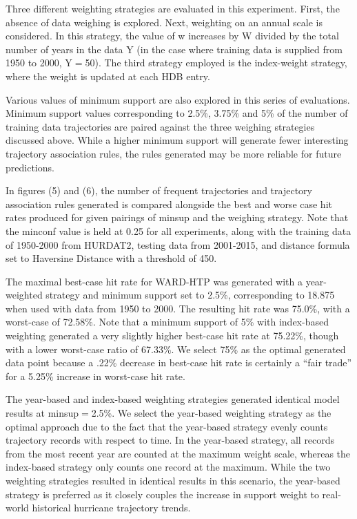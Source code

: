 \documentclass[12pt,conference]{IEEEtran}
\begin{document}
Three different weighting strategies are evaluated in this experiment. First, the absence of data weighing is explored. Next, weighting on an annual scale is considered. In this strategy, the value of w increases by W divided by the total number of years in the data Y (in the case where training data is supplied from 1950 to 2000, Y$=$50). The third strategy employed is the index-weight strategy, where the weight is updated at each HDB entry.

Various values of minimum support are also explored in this series of evaluations. Minimum support values corresponding to 2.5\%, 3.75\% and 5\% of the number of training data trajectories are paired against the three weighing strategies discussed above. While a higher minimum support will generate fewer interesting trajectory association rules, the rules generated may be more reliable for future predictions.

In figures (5) and (6), the number of frequent trajectories and trajectory association rules generated is compared alongside the best and worse case hit rates produced for given pairings of minsup and the weighing strategy. Note that the minconf value is held at 0.25 for all experiments, along with the training data of 1950-2000 from HURDAT2, testing data from 2001-2015, and distance formula set to Haversine Distance with a threshold of 450.

The maximal best-case hit rate for WARD-HTP was generated with a year-weighted strategy and minimum support set to 2.5\%, corresponding to 18.875 when used with data from 1950 to 2000. The resulting hit rate was 75.0\%, with a worst-case of 72.58\%. Note that a minimum support of 5\% with index-based weighting generated a very slightly higher best-case hit rate at 75.22\%, though with a lower worst-case ratio of 67.33\%. We select 75\% as the optimal generated data point because a .22\% decrease in best-case hit rate is certainly a ``fair trade'' for a 5.25\% increase in worst-case hit rate. 

The year-based and index-based weighting strategies generated identical model results at minsup$=$2.5\%. We select the year-based weighting strategy as the optimal approach due to the fact that the year-based strategy evenly counts trajectory records with respect to time. In the year-based strategy, all records from the most recent year are counted at the maximum weight scale, whereas the index-based strategy only counts one record at the maximum. While the two weighting strategies resulted in identical results in this scenario, the year-based strategy is preferred as it closely couples the increase in support weight to real-world historical hurricane trajectory trends.
\end{document}

